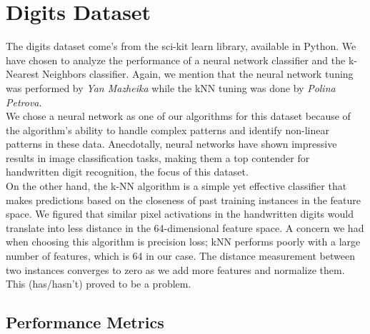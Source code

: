 \documentclass{article}
\begin{document}
\newpage
\section*{Digits Dataset}

The digits dataset come's from the sci-kit learn library, available in Python. We have chosen to analyze the performance of a neural network classifier and the k-Nearest Neighbors classifier. Again, we mention
that the neural network tuning was performed by \textit{Yan Mazheika} while the kNN tuning was done by \textit{Polina Petrova}.
\\

We chose a neural network as one of our algorithms for this dataset because of the algorithm's ability to
handle complex patterns and identify non-linear patterns in these data. Anecdotally, neural networks have shown
impressive results in image classification tasks, making them a top contender for handwritten digit recognition, the focus of this dataset.
\\

On the other hand, the k-NN algorithm is a simple yet effective classifier that makes predictions based on the closeness of past training instances in the feature space. We figured that similar pixel activations in the handwritten digits
would translate into less distance in the 64-dimensional feature space. A concern we had when choosing this algorithm is precision loss; kNN performs poorly with a large number of features, which is 64 in our case. The distance measurement between two instances
converges to zero as we add more features and normalize them. This (has/hasn't) proved to be a problem.

\subsection*{Performance Metrics}

\end{document}
